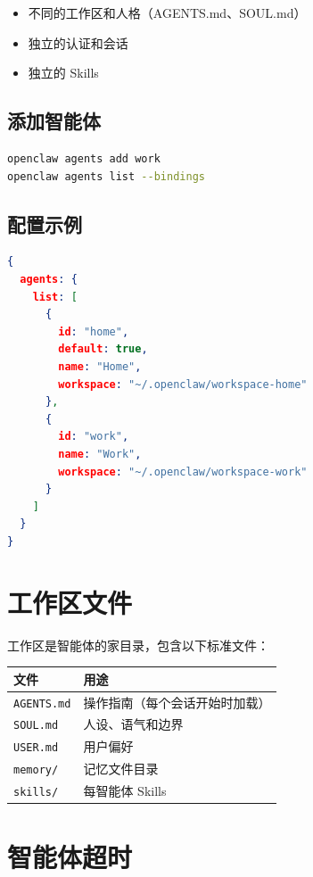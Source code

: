 \begin{itemize}
  \item 不同的工作区和人格（AGENTS.md、SOUL.md）
  \item 独立的认证和会话
  \item 独立的 Skills
\end{itemize}

\subsection{添加智能体}

\begin{lstlisting}[language=bash]
openclaw agents add work
openclaw agents list --bindings
\end{lstlisting}

\subsection{配置示例}

\begin{lstlisting}[language=json]
{
  agents: {
    list: [
      {
        id: "home",
        default: true,
        name: "Home",
        workspace: "~/.openclaw/workspace-home"
      },
      {
        id: "work",
        name: "Work",
        workspace: "~/.openclaw/workspace-work"
      }
    ]
  }
}
\end{lstlisting}

\section{工作区文件}

工作区是智能体的家目录，包含以下标准文件：

\begin{center}
\begin{tabular}{ll}
\toprule
\textbf{文件} & \textbf{用途} \\
\midrule
\texttt{AGENTS.md} & 操作指南（每个会话开始时加载） \\
\texttt{SOUL.md} & 人设、语气和边界 \\
\texttt{USER.md} & 用户偏好 \\
\texttt{memory/} & 记忆文件目录 \\
\texttt{skills/} & 每智能体 Skills \\
\bottomrule
\end{tabular}
\end{center}

\section{智能体超时}

